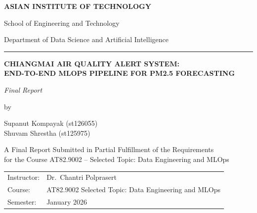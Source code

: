 \documentclass[11pt,a4paper]{report}
\begin{document}

\begin{titlepage}
\thispagestyle{empty}
\begin{center}

\vspace*{1.0cm}

{\large\bfseries ASIAN INSTITUTE OF TECHNOLOGY\par}
{\normalsize School of Engineering and Technology\par}
{\normalsize Department of Data Science and Artificial Intelligence\par}

\vspace{1.5cm}
\rule{0.8\textwidth}{0.5pt}
\vspace{1.2cm}

{\large\bfseries
CHIANGMAI AIR QUALITY ALERT SYSTEM: \\[0.3em]
END-TO-END MLOPS PIPELINE FOR PM2.5 FORECASTING\par}

\vspace{1.8cm}

{\itshape Final Report\par}

\vspace{2.0cm}

by

\vspace{1.5cm}

Supanut Kompayak (st126055) \\[0.3em]
Shuvam Shrestha (st125975)

\vspace{2.0cm}

A Final Report Submitted in Partial Fulfillment of the Requirements \\
for the Course AT82.9002 -- Selected Topic: Data Engineering and MLOps

\vspace{1.5cm}

\begin{tabular}{@{}ll@{}}
Instructor: & Dr.\ Chantri Polprasert \\[0.3em]
Course:     & AT82.9002 Selected Topic: Data Engineering and MLOps \\[0.3em]
Semester:   & January 2026 \\
\end{tabular}


\end{center}
\end{titlepage}
\end{document}
